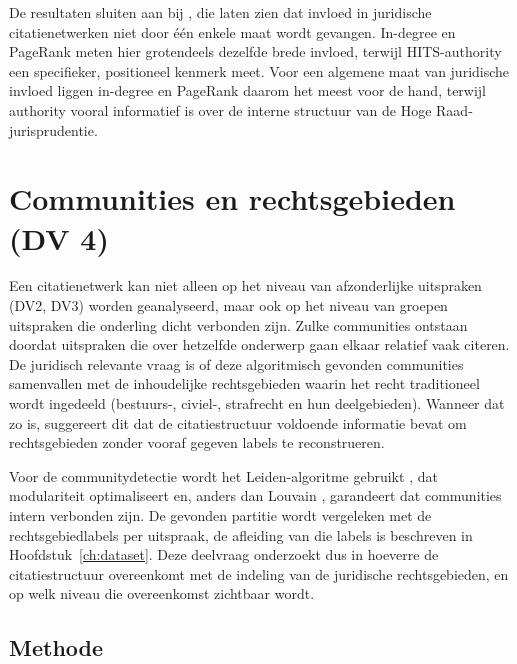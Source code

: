 \documentclass[a4paper, 12pt]{report}
\begin{document}
De resultaten sluiten aan bij \textcite{fowler2008}, die laten zien dat invloed in juridische citatienetwerken niet door één enkele maat wordt gevangen. In-degree en PageRank meten hier grotendeels dezelfde brede invloed, terwijl HITS-authority een specifieker, positioneel kenmerk meet. Voor een algemene maat van juridische invloed liggen in-degree en PageRank daarom het meest voor de hand, terwijl authority vooral informatief is over de interne structuur van de Hoge Raad-jurisprudentie.


\chapter{Communities en rechtsgebieden (DV 4)}
\label{ch:dv4}

Een citatienetwerk kan niet alleen op het niveau van afzonderlijke uitspraken (DV2, DV3) worden geanalyseerd, maar ook op het niveau van groepen uitspraken die onderling dicht verbonden zijn. Zulke communities ontstaan doordat uitspraken die over hetzelfde onderwerp gaan elkaar relatief vaak citeren. De juridisch relevante vraag is of deze algoritmisch gevonden communities samenvallen met de inhoudelijke rechtsgebieden waarin het recht traditioneel wordt ingedeeld (bestuurs-, civiel-, strafrecht en hun deelgebieden). Wanneer dat zo is, suggereert dit dat de citatiestructuur voldoende informatie bevat om rechtsgebieden zonder vooraf gegeven labels te reconstrueren.

Voor de communitydetectie wordt het Leiden-algoritme gebruikt \parencite{traag2019}, dat modulariteit optimaliseert en, anders dan Louvain \parencite{blondel2008}, garandeert dat communities intern verbonden zijn. De gevonden partitie wordt vergeleken met de rechtsgebiedlabels per uitspraak, de afleiding van die labels is beschreven in Hoofdstuk~\ref{ch:dataset}. Deze deelvraag onderzoekt dus in hoeverre de citatiestructuur overeenkomt met de indeling van de juridische rechtsgebieden, en op welk niveau die overeenkomst zichtbaar wordt.


\section{Methode}
\end{document}
